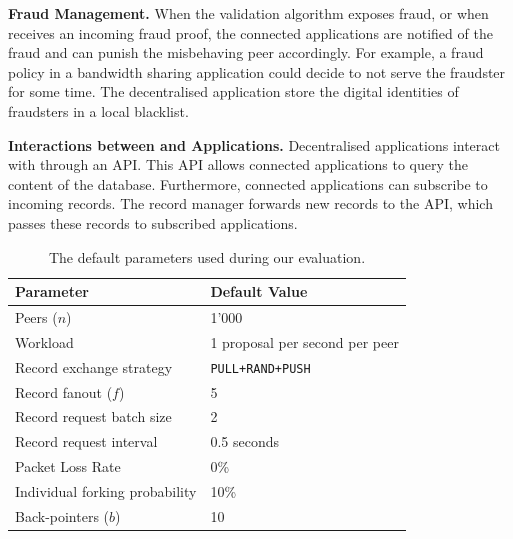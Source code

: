 \textbf{Fraud Management.}
When the validation algorithm exposes fraud, or when \TrustChain{} receives an incoming fraud proof, the connected applications are notified of the fraud and can punish the misbehaving peer accordingly.
For example, a fraud policy in a bandwidth sharing application could decide to not serve the fraudster for some time.
The decentralised application store the digital identities of fraudsters in a local blacklist.

\textbf{Interactions between \TrustChain{} and Applications.}
Decentralised applications interact with \TrustChain{} through an API.
This API allows connected applications to query the content of the database.
Furthermore, connected applications can subscribe to incoming records.
The record manager forwards new records to the API, which passes these records to subscribed applications.

\begin{table}[]
	\begin{center}
		\begin{tabular}{l l}
			\hline
			\textbf{Parameter} & \textbf{Default Value}  \\ \hline
			Peers ($ n $) & 1'000 \\
			Workload & 1 proposal per second per peer \\
			Record exchange strategy & \texttt{PULL+RAND+PUSH} \\
			Record fanout ($ f $) & 5 \\
			Record request batch size & 2 \\
			Record request interval & 0.5 seconds \\
			Packet Loss Rate & 0\% \\
			Individual forking probability & 10\% \\
			Back-pointers ($ b $) & 10 \\ \hline
		\end{tabular}
		\caption{The default parameters used during our evaluation.}
		\label{tab:experiment_parameters}
	\end{center}
\end{table}


